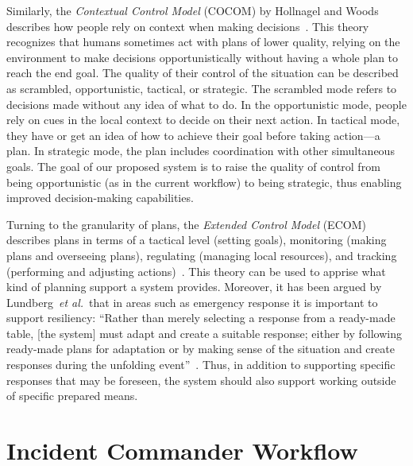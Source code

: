 \documentclass[conference,10pt,letter]{IEEEtran}
\def\etal{\textit{et al.}}
\begin{document}
Similarly, the \emph{Contextual Control Model} (COCOM) by Hollnagel and Woods describes how people rely on context when making decisions~\cite{hollnagel2005joint}. This theory recognizes that humans sometimes act with plans of lower quality, relying on the environment to make decisions opportunistically without having a whole plan to reach the end goal. The quality of their control of the situation can be described as scrambled, opportunistic, tactical, or strategic. The scrambled mode refers to decisions made without any idea of what to do. In the opportunistic mode, people rely on cues in the local context to decide on their next action. In tactical mode, they have or get an idea of how to achieve their goal before taking action---a plan. In strategic mode, the plan includes coordination with other simultaneous goals. The goal of our proposed system is to raise the quality of control from being opportunistic (as in the current workflow) to being strategic, thus enabling improved decision-making capabilities.

Turning to the granularity of plans, the \emph{Extended Control Model} (ECOM) describes plans in terms of a tactical level (setting goals), monitoring (making plans and overseeing plans), regulating (managing local resources), and tracking (performing and adjusting actions)~\cite{hollnagel2005joint}. This theory can be used to apprise what kind of planning support a system provides.  Moreover, it has been argued by Lundberg~\etal\ that in areas such as emergency response it is important to support resiliency: ``Rather than merely selecting a response from a ready-made table, [the system] must adapt and create a suitable response; either by following ready-made plans for adaptation or by making sense of the situation and create responses during the unfolding event''~\cite{Lundberg2012}. Thus, in addition to supporting specific responses that may be foreseen, the system should also support working outside of specific prepared means.


\section{Incident Commander Workflow} \label{sec:workflow}
\end{document}

